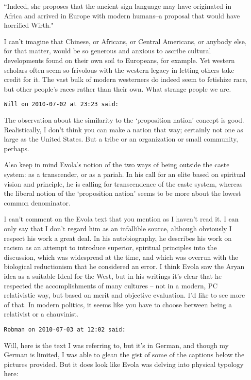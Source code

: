 \begin{footnotesize}
\begin{sffamily}
``Indeed, she proposes that the ancient sign language may have originated in Africa and arrived in Europe with modern humans–a proposal that would have horrified Wirth."

I can't imagine that Chinese, or Africans, or Central Americans, or anybody else, for that matter, would be so generous and anxious to ascribe cultural developments found on their own soil to Europeans, for example. Yet western scholars often seem so frivolous with the western legacy in letting others take credit for it. The vast bulk of modern westerners do indeed seem to fetishize race, but other people's races rather than their own. What strange people we are.


\hfill

\texttt{Will on 2010-07-02 at 23:23 said: }

The observation about the similarity to the `proposition nation' concept is good. Realistically, I don't think you can make a nation that way; certainly not one as large as the United States. But a tribe or an organization or small community, perhaps.

Also keep in mind Evola's notion of the two ways of being outside the caste system: as a transcender, or as a pariah. In his call for an elite based on spiritual vision and principle, he is calling for transcendence of the caste system, whereas the liberal notion of the `proposition nation' seems to be more about the lowest common denominator.

I can't comment on the Evola text that you mention as I haven't read it. I can only say that I don't regard him as an infallible source, although obviously I respect his work a great deal. In his autobiography, he describes his work on racism as an attempt to introduce superior, spiritual principles into the discussion, which was widespread at the time, and which was overrun with the biological reductionism that he considered an error. I think Evola saw the Aryan idea as a suitable Ideal for the West, but in his writings it's clear that he respected the accomplishments of many cultures – not in a modern, PC relativistic way, but based on merit and objective evaluation. I'd like to see more of that. In modern politics, it seems like you have to choose between being a relativist or a chauvinist.


\hfill

\texttt{Robman on 2010-07-03 at 12:02 said: }

Will, here is the text I was referring to, but it's in German, and though my German is limited, I was able to glean the gist of some of the captions below the pictures provided. But it does look like Evola was delving into physical typology here:


\end{sffamily}
\end{footnotesize}
